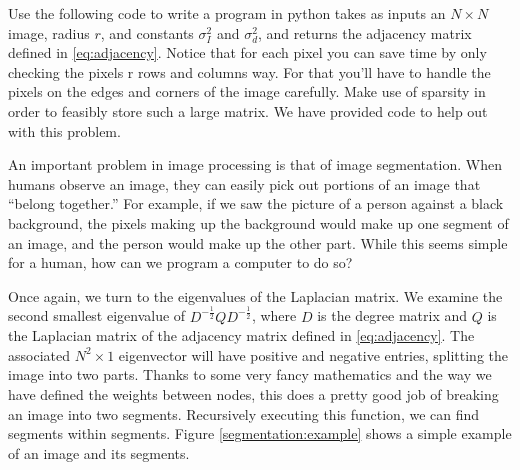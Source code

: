 \begin{problem}  Use the following code to write a program in python takes as inputs an $N \times N$ image, radius $r$, and constants $\sigma_I^2$ and $\sigma_d^2$, and returns the adjacency matrix defined in \eqref{eq:adjacency}.
Notice that for each pixel you can save time by only checking the pixels r rows and columns way.
For that you'll have to handle the pixels on the edges and corners of the image carefully.
Make use of sparsity in order to feasibly store such a large matrix.
We have provided code to help out with this problem.
\end{problem}

An important problem in image processing is that of image segmentation.
When humans observe an image, they can easily pick out portions of an image that ``belong together.''
For example, if we saw the picture of a person against a black background, the pixels making up the background would make up one segment of an image, and the person would make up the other part.
While this seems simple for a human, how can we program a computer to do so?

Once again, we turn to the eigenvalues of the Laplacian matrix.
We examine the second smallest eigenvalue of $D^{-\frac{1}{2}}QD^{-\frac{1}{2}}$, where $D$ is the degree matrix and $Q$ is the Laplacian matrix of the adjacency matrix defined in \eqref{eq:adjacency}.
The associated $N^2 \times 1$ eigenvector will have positive and negative entries, splitting the image into two parts.
Thanks to some very fancy mathematics and the way we have defined the weights between nodes, this does a pretty good job of breaking an image into two segments.
Recursively executing this function, we can find segments within segments.
Figure \ref{segmentation:example} shows a simple example of an image and its segments.


